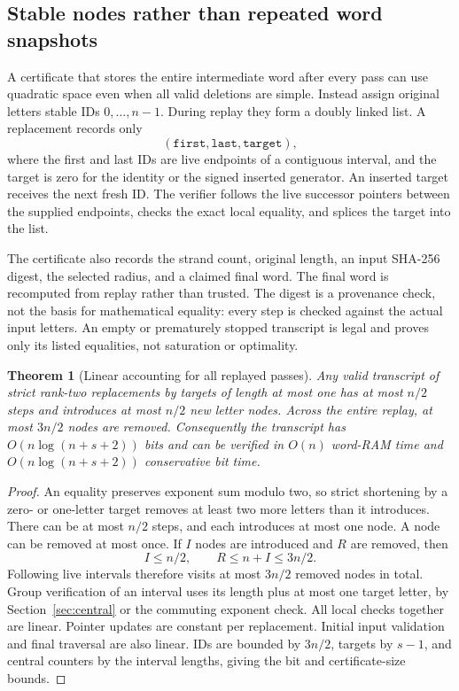 \documentclass[11pt]{article}
\newtheorem{theorem}{Theorem}[section]
\theoremstyle{definition}
\theoremstyle{remark}
\begin{document}
\subsection{Stable nodes rather than repeated word snapshots}
A certificate that stores the entire intermediate word after every pass can
use quadratic space even when all valid deletions are simple. Instead assign
original letters stable IDs $0,\ldots,n-1$. During replay they form a doubly
linked list. A replacement records only
\[
 (\texttt{first},\texttt{last},\texttt{target}),
\]
where the first and last IDs are live endpoints of a contiguous interval,
and the target is zero for the identity or the signed inserted generator.
An inserted target receives the next fresh ID. The verifier follows the
live successor pointers between the supplied endpoints, checks the exact
local equality, and splices the target into the list.

The certificate also records the strand count, original length, an input
SHA-256 digest, the selected radius, and a claimed final word. The final word
is recomputed from replay rather than trusted. The digest is a provenance
check, not the basis for mathematical equality: every step is checked against
the actual input letters. An empty or prematurely stopped transcript is
legal and proves only its listed equalities, not saturation or optimality.

\begin{theorem}[Linear accounting for all replayed passes]\label{thm:replay}
Any valid transcript of strict rank-two replacements by targets of length at
most one has at most $n/2$ steps and introduces at most $n/2$ new letter nodes.
Across the entire replay, at most $3n/2$ nodes are removed. Consequently the
transcript has $O(n\log(n+s+2))$ bits and can be verified in $O(n)$ word-RAM
time and $O(n\log(n+s+2))$ conservative bit time.
\end{theorem}
\begin{proof}
An equality preserves exponent sum modulo two, so strict shortening by a
zero- or one-letter target removes at least two more letters than it
introduces. There can be at most $n/2$ steps, and each introduces at most one
node. A node can be removed at most once. If $I$ nodes are introduced and $R$
are removed, then
\[
 I\le n/2,\qquad R\le n+I\le3n/2.
\]
Following live intervals therefore visits at most $3n/2$ removed nodes in
total. Group verification of an interval uses its length plus at most one
target letter, by Section~\ref{sec:central} or the commuting exponent check.
All local checks together are linear. Pointer updates are constant per
replacement. Initial input validation and final traversal are also linear.
IDs are bounded by $3n/2$, targets by $s-1$, and central counters by the
interval lengths, giving the bit and certificate-size bounds.
\end{proof}
\end{document}
